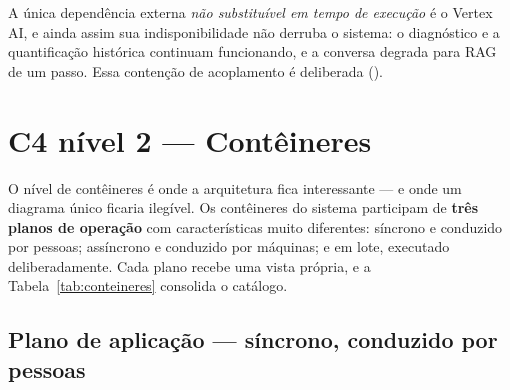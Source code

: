 \begin{nota}
A única dependência externa \emph{não substituível em tempo de execução} é o
Vertex AI, e ainda assim sua indisponibilidade não derruba o sistema: o
diagnóstico e a quantificação histórica continuam funcionando, e a conversa
degrada para RAG de um passo. Essa contenção de acoplamento é deliberada
().
\end{nota}

\section{C4 nível 2 --- Contêineres}
\label{sec:c4nivel2}

O nível de contêineres é onde a arquitetura fica interessante --- e onde um
diagrama único ficaria ilegível. Os contêineres do sistema participam de
\textbf{três planos de operação} com características muito diferentes:
síncrono e conduzido por pessoas; assíncrono e conduzido por máquinas; e em
lote, executado deliberadamente. Cada plano recebe uma vista própria, e a
Tabela~\ref{tab:conteineres} consolida o catálogo.

\subsection{Plano de aplicação --- síncrono, conduzido por pessoas}


